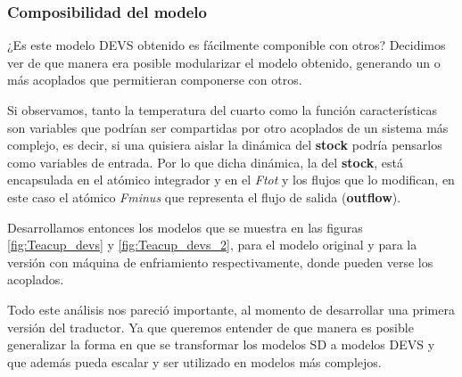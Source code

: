 \subsubsection{Composibilidad del modelo}

¿Es este modelo DEVS obtenido es fácilmente componible con otros? Decidimos ver de que manera era posible modularizar el modelo obtenido, generando un o más acoplados que permitieran componerse con otros.

Si observamos, tanto la temperatura del cuarto como la función características son variables que podrían ser compartidas por otro acoplados de un sistema más complejo, es decir, si una quisiera aislar la dinámica del \textbf{stock} podría pensarlos como variables de entrada. Por lo que dicha dinámica, la del \textbf{stock}, está encapsulada en el atómico integrador y en el \textit{Ftot} y los flujos que lo modifican, en este caso el atómico \textit{Fminus} que representa el flujo de salida (\textbf{outflow}).

Desarrollamos entonces los modelos que se muestra en las figuras \ref{fig:Teacup_devs} y \ref{fig:Teacup_devs_2}, para el modelo original y para la versión con máquina de enfriamiento respectivamente, donde pueden verse los acoplados. 

Todo este análisis nos pareció importante, al momento de desarrollar una primera versión del traductor. Ya que queremos entender de que manera es posible generalizar la forma en que se transformar los modelos SD a modelos DEVS y que además pueda escalar y ser utilizado en modelos más complejos. 

